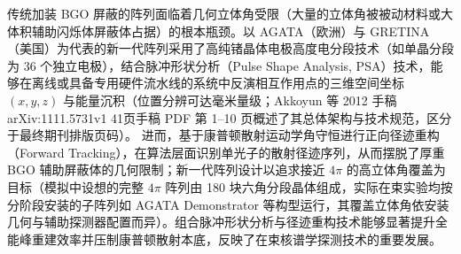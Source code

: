 \begin{enumerate}
传统加装 BGO 屏蔽的阵列面临着几何立体角受限（大量的立体角被被动材料或大体积辅助闪烁体屏蔽体占据）的根本瓶颈。以 AGATA（欧洲）与 GRETINA（美国）为代表的新一代阵列采用了高纯锗晶体电极高度电分段技术（如单晶分段为 36 个独立电极），结合脉冲形状分析（Pulse Shape Analysis, PSA）技术，能够在离线或具备专用硬件流水线的系统中反演相互作用点的三维空间坐标 $(x, y, z)$ 与能量沉积（位置分辨可达毫米量级；Akkoyun 等 2012 手稿 arXiv:1111.5731v1 41页手稿 PDF 第 1–10 页概述了其总体架构与技术规范，区分于最终期刊排版页码）。
进而，基于康普顿散射运动学角守恒进行正向径迹重构（Forward Tracking），在算法层面识别单光子的散射径迹序列，从而摆脱了厚重 BGO 辅助屏蔽体的几何限制；新一代阵列设计以追求接近 $4\pi$ 的高立体角覆盖为目标（模拟中设想的完整 $4\pi$ 阵列由 180 块六角分段晶体组成，实际在束实验均按分阶段安装的子阵列如 AGATA Demonstrator 等构型运行，其覆盖立体角依安装几何与辅助探测器配置而异）。组合脉冲形状分析与径迹重构技术能够显著提升全能峰重建效率并压制康普顿散射本底，反映了在束核谱学探测技术的重要发展。
\end{enumerate}
